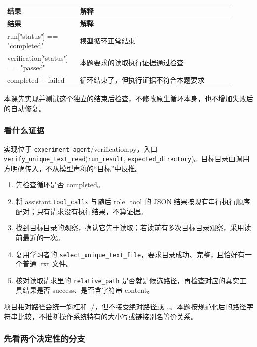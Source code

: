 \documentclass[UTF8,zihao=-4,fontset=fandol]{ctexart}
\begin{document}
{\small\setlength{\tabcolsep}{4pt}
\renewcommand{\arraystretch}{1.25}
\begin{longtable}{>{\raggedright\arraybackslash}p{0.28\linewidth}>{\raggedright\arraybackslash}p{0.63\linewidth}}
\toprule
\textbf{结果} & \textbf{解释} \\
\midrule\endfirsthead
\toprule
\textbf{结果} & \textbf{解释} \\
\midrule\endhead
\bottomrule\endfoot
run["status"] == "completed" & 模型循环正常结束 \\
verification["status"] == "passed" & 本题要求的读取执行证据通过检查 \\
completed + failed & 循环结束了，但执行证据不符合本题要求 \\
\end{longtable}}

本课先实现并测试这个独立的结束后检查，不修改原生循环本身，也不增加失败后的自动修复。

\subsubsection{看什么证据}

实现位于 \nolinkurl{experiment_agent}/verification.py，入口 \nolinkurl{verify_unique_text_read}(\nolinkurl{run_result}, \nolinkurl{expected_directory})。目标目录由调用方明确传入，不从模型声称的“目标”中反推。

\begin{enumerate}
\item 先检查循环是否 completed。
\item 将 assistant.\nolinkurl{tool_calls} 与随后 role=tool 的 JSON 结果按现有串行执行顺序配对；只有请求没有执行结果，不算证据。
\item 找到目标目录的观察，确认它先于读取；若读前有多次目标目录观察，采用读前最近的一次。
\item 复用学习者的 \nolinkurl{select_unique_text_file}，要求目录成功、完整，且恰好有一个普通 .txt 文件。
\item 核对读取请求里的 \nolinkurl{relative_path} 是否就是候选路径，再检查对应的真实工具结果是否 success、是否含字符串 content。
\end{enumerate}

项目相对路径会统一斜杠和 ./，但不接受绝对路径或 ..。本题按规范化后的路径字符串比较，不推断操作系统特有的大小写或链接别名等价关系。

\subsubsection{先看两个决定性的分支}
\end{document}
